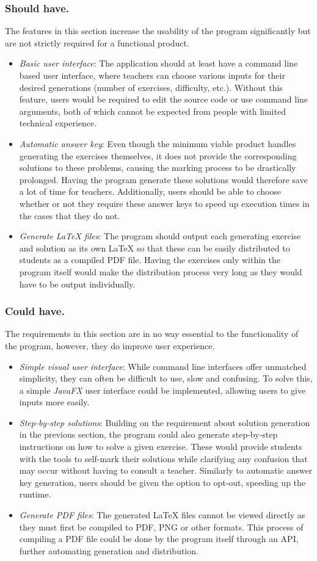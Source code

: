\documentclass{l4proj}
\begin{document}
\subsubsection{Should have.}
The features in this section increase the usability of the program significantly but are not strictly required for a functional product.
\begin{itemize}
	\item
	\emph{Basic user interface}: The application should at least have a command line based user interface, where teachers can choose various inputs for their desired generations (number of exercises, difficulty, etc.). Without this feature, users would be required to edit the source code or use command line arguments, both of which cannot be expected from people with limited technical experience. 
	\item
	\emph{Automatic answer key}: Even though the minimum viable product handles generating the exercises themselves,  it does not provide the corresponding solutions to these problems, causing the marking process to be drastically prolonged. Having the program generate these solutions would therefore save a lot of time for teachers. Additionally, users should be able to choose whether or not they require these answer keys to speed up execution times in the cases that they do not.
	\item
	\emph{Generate LaTeX files}: The program should output each generating exercise and solution as its own LaTeX so that these can be easily distributed to students as a compiled PDF file. Having the exercises only within the program itself would make the distribution process very long as they would have to be output individually.
\end{itemize}
\subsubsection{Could have.}
The requirements in this section are in no way essential to the functionality of the program, however, they do improve user experience.
\begin{itemize}
	\item
	\emph{Simple visual user interface}: While command line interfaces offer unmatched simplicity, they can often be difficult to use, slow and confusing. To solve this, a simple \emph{JavaFX}   user interface could be implemented, allowing users to give inputs more easily.
	\item
	\emph{Step-by-step solutions}: Building on the requirement about solution generation in the previous section, the program could also generate step-by-step instructions on how to solve a given exercise. These would provide students with the tools to self-mark their solutions while clarifying any confusion that may occur without having to consult a teacher. Similarly to automatic answer key generation, users should be given the option to opt-out, speeding up the runtime.
	\item
	\emph{Generate PDF files}: The generated LaTeX files cannot be viewed directly as they must first be compiled to PDF, PNG or other formats. This process of compiling a PDF file could be done by the program itself through an API, further automating generation and distribution.
\end{itemize}
\end{document}
